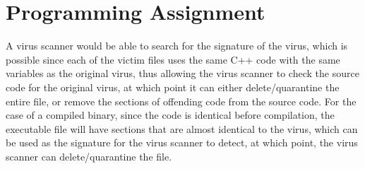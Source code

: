 \documentclass[12pt,a4paper]{article}
\begin{document}
\section{Programming Assignment}
A virus scanner would be able to search for the signature of the virus, which is possible since each of the victim files uses the same C++ code with the same variables as the original virus, thus allowing the virus scanner to check the source code for the original virus, at which point it can either delete/quarantine the entire file, or remove the sections of offending code from the source code. For the case of a compiled binary, since the code is identical before compilation, the executable file will have sections that are almost identical to the virus, which can be used as the signature for the virus scanner to detect, at which point, the virus scanner can delete/quarantine the file.
\end{document}
